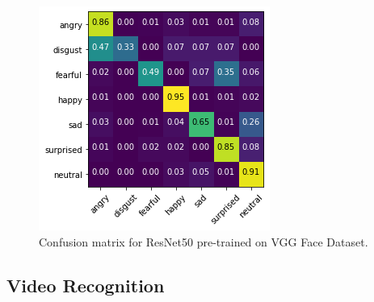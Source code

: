 \documentclass[sigconf]{acmart}
\begin{document}
{\begin{figure}[htbp]
	\includegraphics[width=0.7\linewidth]{images/image-vgg.png}
	\caption{Confusion matrix for ResNet50 pre-trained on VGG Face Dataset.}
  \label{fig:image-vgg}
\end{figure}





\subsection{Video Recognition}

}
\end{document}
